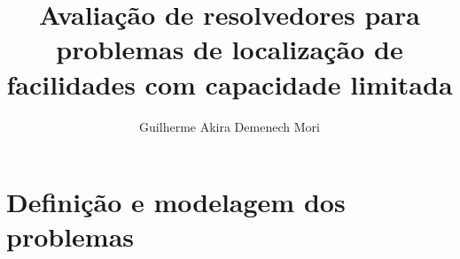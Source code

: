 \documentclass[]{article}
\title{Avaliação de resolvedores para problemas de localização de facilidades com capacidade limitada}
\author{Guilherme Akira Demenech Mori}
\newif\ifrelatorio
\newif\ifartigo
\begin{document}
	\maketitle

	\begin{abstract}
	
	\end{abstract}

\ifrelatorio
	\tableofcontents		
	\ifartigo
		\listoftables
	\fi	
\fi

\ifartigo
	\section{Introdução}
\fi	
	
\ifrelatorio	
	\section{Atividades desenvolvidas}
		\begin{enumerate}
			\item \textbf{Estudo de modelos de otimização linear}:
			\item \textbf{Estudo de solução gráfica e método simplex}:
			\item \textbf{Estudo de modelos de otimização inteira}:
			\item \textbf{Estudo do método \textit{branch-and-bound}}:
			\item \textbf{Estudo da configuração padrão e dos recursos disponíveis de cada pacote computacional escolhido}:
			\item \textbf{Implementação de um modelo clássico de otimização utilizando os pacotes computacionais escolhidos}:
			\item \textbf{Estudo de uma técnica de decomposição de um problema prático e o surgimento do modelo escolhido como subproblema}:
			\item \textbf{Testes computacionais e avaliação comparativa dos resultados}:
		\end{enumerate}
\fi	

\ifartigo
	\section{Revisão da literatura}
	
\fi		

\ifartigo	
	\section{Definição e modelagem dos problemas} \label{defmodel:cflp}
	
\end{document}
